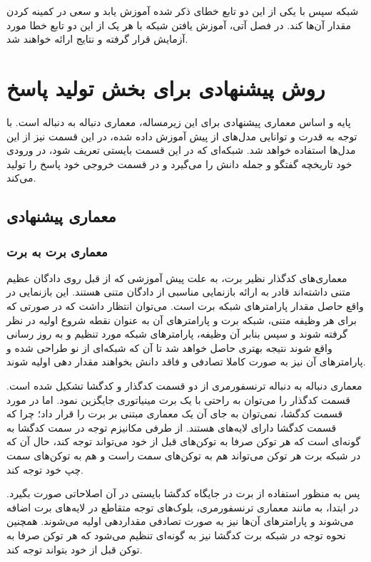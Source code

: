 شبکه سپس با یکی از این دو تابع خطای ذکر شده آموزش یابد و سعی در کمینه کردن مقدار آن‌ها کند. در فصل آتی، آموزش یافتن شبکه با هر یک از این دو تابع خطا مورد آزمایش قرار گرفته و نتایج ارائه خواهند شد.

\section{روش پیشنهادی برای بخش تولید پاسخ}

پایه و اساس معماری پیشنهادی برای این زیرمساله، معماری دنباله به دنباله است. با توجه به قدرت و توانایی مدل‌های از پیش آموزش داده شده، در این قسمت نیز از این مدل‌ها استفاده خواهد شد.
شبکه‌ای که در این قسمت بایستی تعریف شود،‌ در ورودی خود تاریخچه گفتگو و جمله دانش را می‌گیرد و در قسمت خروجی خود پاسخ را تولید می‌کند. 
\subsection{معماری پیشنهادی}

\subsubsection{معماری برت به برت} \label{chap4:generation:bert2bert}

معماری‌های کدگذار نظیر برت، به علت پیش آموزشی که از قبل روی دادگان عظیم متنی داشته‌اند قادر به ارائه بازنمایی مناسبی از دادگان متنی هستند. این بازنمایی در واقع حاصل مقدار پارامتر‌های شبکه برت است. می‌توان انتظار داشت که در صورتی که برای هر وظیفه متنی،‌ شبکه برت و پارامتر‌های آن به عنوان نقطه شروع اولیه در نظر گرفته شوند و سپس بنابر آن وظیفه، پارامتر‌های شبکه مورد تنظیم و به روز رسانی واقع شوند نتیجه بهتری حاصل خواهد شد تا آن که شبکه‌ای از نو طراحی شده و پارامتر‌های آن نیز به صورت کاملا تصادفی و فاقد دانش بخواهند مقدار دهی اولیه شوند. 

معماری دنباله به دنباله ترنسفورمری از دو قسمت کدگذار و کدگشا تشکیل شده است. قسمت کدگذار را می‌توان به راحتی با یک برت مینیاتوری جایگزین نمود. اما در مورد قسمت کدگشا، نمی‌توان به جای آن  یک معماری مبتنی بر برت را قرار داد؛ چرا که قسمت کدگشا دارای لایه‌های 
هستند. از طرفی مکانیزم توجه در سمت کدگشا به گونه‌ای است که هر توکن صرفا به توکن‌های قبل از خود می‌تواند توجه کند، حال آن که در شبکه برت هر توکن می‌تواند هم به توکن‌های سمت راست و هم به توکن‌های سمت چپ خود توجه کند. 

پس به منظور استفاده از برت در جایگاه کدگشا بایستی در آن اصلاحاتی صورت بگیرد. در ابتدا، به مانند معماری ترنسفورمری،‌ بلوک‌های توجه متقاطع در لایه‌های برت اضافه می‌شوند و پارامتر‌های آن‌ها نیز به صورت تصادفی مقداردهی اولیه می‌شوند. همچنین نحوه توجه در شبکه برت کدگشا نیز به گونه‌ای تنظیم می‌شود که هر توکن صرفا به توکن قبل از خود بتواند توجه کند.

